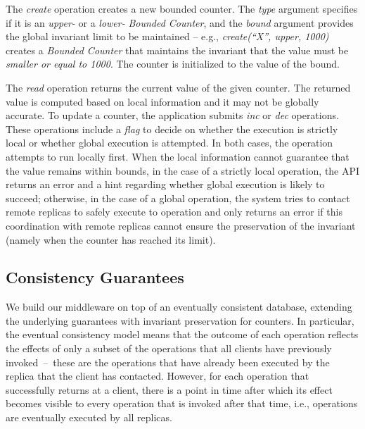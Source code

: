 \documentclass[conference]{IEEEtran}
\newcommand{\InvCounter}{\emph{Bounded Counter}}
\begin{document}
The \emph{create} operation creates a new bounded counter. 
The \emph{type} argument specifies if it is an \emph{upper-} or a \emph{lower-} \InvCounter{}, 
and the \emph{bound} argument provides the global invariant limit to be maintained -- e.g., 
\emph{create(``X'', upper, 1000)} creates a \InvCounter{} that maintains the invariant 
that the value must be \emph{smaller or equal to 1000}. 
The counter is initialized to the value of the bound.



The \emph{read} operation returns the current value of the given counter. 
The returned value is computed based on local information and it may not be globally accurate. 
To update a counter, the application submits \emph{inc} or \emph{dec} operations. 
These operations include a \emph{flag} to decide on whether the execution is strictly local or whether global execution is attempted.
In both cases, the operation attempts to run locally first. When the local information cannot guarantee that the value remains within bounds, in the case of a strictly local operation, the API returns an error and a hint regarding whether global execution is likely to succeed; otherwise, in the case of a global operation, the system tries to contact remote replicas to safely execute to operation and only returns an error if this coordination with remote replicas cannot ensure the preservation of the invariant (namely when the counter has reached its limit).



  


\subsection{Consistency Guarantees}

We build our middleware on top of an eventually consistent database, 
extending the underlying guarantees with invariant preservation for counters.
In particular, the eventual consistency model means that the outcome of each operation reflects
the effects of only a subset of the operations that all clients have previously invoked~--~these are the
operations that have already been executed by the replica that the client has contacted. However, for
each operation that successfully returns at a client, there is a point in time after which its effect
becomes visible to every operation that is invoked after that time, i.e., operations are eventually
executed by all replicas.
\end{document}
